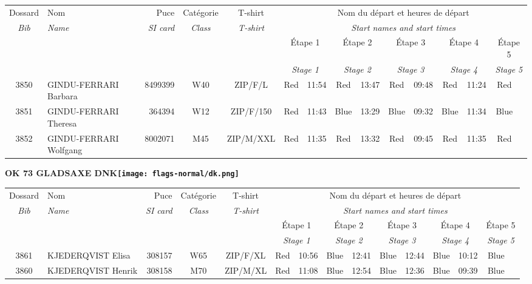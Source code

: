 \documentclass{report}
\begin{document}
  \begin{longtable}{|c|l|r|c|c|*{5}{cc|}}
    Dossard & Nom  & Puce    & Catégorie & T-shirt & \multicolumn{10}{c|}{Nom du départ et heures de départ} \\
    \itshape Bib     & \itshape Name & \itshape SI card & \itshape Class  & \itshape  T-shirt  & \multicolumn{10}{c|}{\itshape Start names and start times} \\
    \hline
    & & & & & \multicolumn{2}{c|}{Étape 1} & \multicolumn{2}{c|}{Étape 2} & \multicolumn{2}{c|}{Étape 3} & \multicolumn{2}{c|}{Étape 4} & \multicolumn{2}{c|}{Étape 5} \\
    & & & & & \multicolumn{2}{c|}{\itshape Stage 1} & \multicolumn{2}{c|}{\itshape Stage 2} & \multicolumn{2}{c|}{\itshape Stage 3} & \multicolumn{2}{c|}{\itshape Stage 4} & \multicolumn{2}{c|}{\itshape Stage 5} \\
    \hline
    3850 & GINDU-FERRARI Barbara & 8499399 & W40 & ZIP/F/L & Red & 11:54 & Red & 13:47 & Red & 09:48 & Red & 11:24 & Red &  \\
    3851 & GINDU-FERRARI Theresa & 364394 & W12 & ZIP/F/150 & Red & 11:43 & Blue & 13:29 & Blue & 09:32 & Blue & 11:34 & Blue &  \\
    3852 & GINDU-FERRARI Wolfgang & 8002071 & M45 & ZIP/M/XXL & Red & 11:35 & Red & 13:32 & Red & 09:45 & Red & 11:35 & Red &  \\
  \end{longtable}
\newpage
  \Huge \centering \bfseries OK 73 GLADSAXE  DNK\normalfont \footnotesize \sffamily \hfill \texttt{[image: flags-normal/dk.png]} \newline 
  \begin{longtable}{|c|l|r|c|c|*{5}{cc|}}
    Dossard & Nom  & Puce    & Catégorie & T-shirt & \multicolumn{10}{c|}{Nom du départ et heures de départ} \\
    \itshape Bib     & \itshape Name & \itshape SI card & \itshape Class  & \itshape  T-shirt  & \multicolumn{10}{c|}{\itshape Start names and start times} \\
    \hline
    & & & & & \multicolumn{2}{c|}{Étape 1} & \multicolumn{2}{c|}{Étape 2} & \multicolumn{2}{c|}{Étape 3} & \multicolumn{2}{c|}{Étape 4} & \multicolumn{2}{c|}{Étape 5} \\
    & & & & & \multicolumn{2}{c|}{\itshape Stage 1} & \multicolumn{2}{c|}{\itshape Stage 2} & \multicolumn{2}{c|}{\itshape Stage 3} & \multicolumn{2}{c|}{\itshape Stage 4} & \multicolumn{2}{c|}{\itshape Stage 5} \\
    \hline
    3861 & KJEDERQVIST Elisa & 308157 & W65 & ZIP/F/XL & Red & 10:56 & Blue & 12:41 & Blue & 12:44 & Blue & 10:12 & Blue &  \\
    3860 & KJEDERQVIST Henrik & 308158 & M70 & ZIP/M/XL & Red & 11:08 & Blue & 12:54 & Blue & 12:36 & Blue & 09:39 & Blue &  \\
  \end{longtable}
\end{document}
